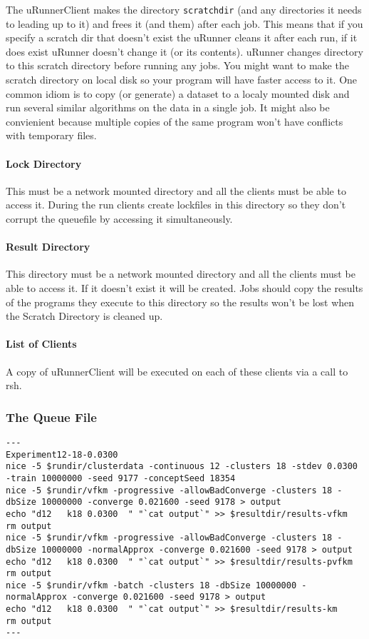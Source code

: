 The u\-Runner\-Client makes the directory {\tt scratchdir} (and any directories it needs to leading up to it) and frees it (and them) after each job. This means that if you specify a scratch dir that doesn't exist the u\-Runner cleans it after each run, if it does exist u\-Runner doesn't change it (or its contents). u\-Runner changes directory to this scratch directory before running any jobs. You might want to make the scratch directory on local disk so your program will have faster access to it. One common idiom is to copy (or generate) a dataset to a localy mounted disk and run several similar algorithms on the data in a single job. It might also be convienient because multiple copies of the same program won't have conflicts with temporary files.

\paragraph*{Lock Directory}

This must be a network mounted directory and all the clients must be able to access it. During the run clients create lockfiles in this directory so they don't corrupt the queuefile by accessing it simultaneously.

\paragraph*{Result Directory}

This directory must be a network mounted directory and all the clients must be able to access it. If it doesn't exist it will be created. Jobs should copy the results of the programs they execute to this directory so the results won't be lost when the Scratch Directory is cleaned up.

\paragraph*{List of Clients}

A copy of u\-Runner\-Client will be executed on each of these clients via a call to rsh.

\subsubsection*{The Queue File}



\footnotesize\begin{verbatim}
---
Experiment12-18-0.0300
nice -5 $rundir/clusterdata -continuous 12 -clusters 18 -stdev 0.0300 -train 10000000 -seed 9177 -conceptSeed 18354
nice -5 $rundir/vfkm -progressive -allowBadConverge -clusters 18 -dbSize 10000000 -converge 0.021600 -seed 9178 > output
echo "d12	k18	0.0300	" "`cat output`" >> $resultdir/results-vfkm
rm output
nice -5 $rundir/vfkm -progressive -allowBadConverge -clusters 18 -dbSize 10000000 -normalApprox -converge 0.021600 -seed 9178 > output
echo "d12	k18	0.0300	" "`cat output`" >> $resultdir/results-pvfkm
rm output
nice -5 $rundir/vfkm -batch -clusters 18 -dbSize 10000000 -normalApprox -converge 0.021600 -seed 9178 > output
echo "d12	k18	0.0300	" "`cat output`" >> $resultdir/results-km
rm output
---
\end{verbatim}\normalsize


